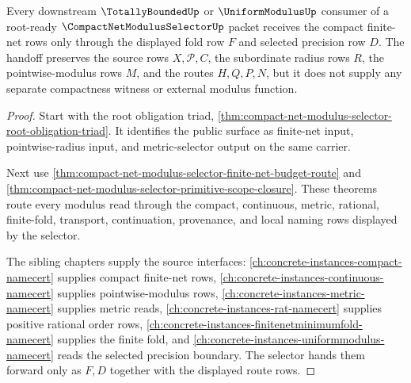\begin{theorem}
\label{thm:compact-net-modulus-selector-totallybounded-handoff}
Every downstream $\TotallyBoundedUp$ or $\UniformModulusUp$ consumer of a root-ready $\CompactNetModulusSelectorUp$ packet receives the compact finite-net rows only through the displayed fold row $F$ and selected precision row $D$. The handoff preserves the source rows $X,\mathcal{P},C$, the subordinate radius rows $R$, the pointwise-modulus rows $M$, and the routes $H,Q,P,N$, but it does not supply any separate compactness witness or external modulus function.
\end{theorem}
\begin{proof}
Start with the root obligation triad, \autoref{thm:compact-net-modulus-selector-root-obligation-triad}. It identifies the public surface as finite-net input, pointwise-radius input, and metric-selector output on the same carrier.

Next use \autoref{thm:compact-net-modulus-selector-finite-net-budget-route} and \autoref{thm:compact-net-modulus-selector-primitive-scope-closure}. These theorems route every modulus read through the compact, continuous, metric, rational, finite-fold, transport, continuation, provenance, and local naming rows displayed by the selector.

The sibling chapters supply the source interfaces: \autoref{ch:concrete-instances-compact-namecert} supplies compact finite-net rows, \autoref{ch:concrete-instances-continuous-namecert} supplies pointwise-modulus rows, \autoref{ch:concrete-instances-metric-namecert} supplies metric reads, \autoref{ch:concrete-instances-rat-namecert} supplies positive rational order rows, \autoref{ch:concrete-instances-finitenetminimumfold-namecert} supplies the finite fold, and \autoref{ch:concrete-instances-uniformmodulus-namecert} reads the selected precision boundary. The selector hands them forward only as $F,D$ together with the displayed route rows.
\end{proof}

